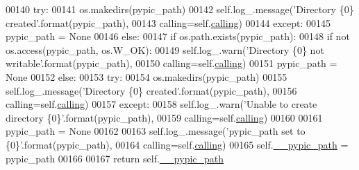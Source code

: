 \begin{DoxyCode}
00140                     \textcolor{keywordflow}{try}:
00141                         os.makedirs(pypic\_path)
00142                         self.log\_.message(\textcolor{stringliteral}{'Directory \{0\} created'}.format(pypic\_path),
00143                                           calling=self.\hyperlink{classpyneb_1_1utils_1_1_config_1_1___config_abf04542e5670abea107260ca7a6baf6d}{calling})
00144                     \textcolor{keywordflow}{except}:
00145                         pypic\_path = \textcolor{keywordtype}{None}
00146         \textcolor{keywordflow}{else}:
00147             \textcolor{keywordflow}{if} os.path.exists(pypic\_path):
00148                 \textcolor{keywordflow}{if} \textcolor{keywordflow}{not} os.access(pypic\_path, os.W\_OK):
00149                     self.log\_.warn(\textcolor{stringliteral}{'Directory \{0\} not writable'}.format(pypic\_path),
00150                                       calling=self.\hyperlink{classpyneb_1_1utils_1_1_config_1_1___config_abf04542e5670abea107260ca7a6baf6d}{calling})
00151                     pypic\_path = \textcolor{keywordtype}{None}
00152             \textcolor{keywordflow}{else}:
00153                 \textcolor{keywordflow}{try}:
00154                     os.makedirs(pypic\_path)
00155                     self.log\_.message(\textcolor{stringliteral}{'Directory \{0\} created'}.format(pypic\_path),
00156                                       calling=self.\hyperlink{classpyneb_1_1utils_1_1_config_1_1___config_abf04542e5670abea107260ca7a6baf6d}{calling})
00157                 \textcolor{keywordflow}{except}:
00158                     self.log\_.warn(\textcolor{stringliteral}{'Unable to create directory \{0\}'}.format(pypic\_path),
00159                                       calling=self.\hyperlink{classpyneb_1_1utils_1_1_config_1_1___config_abf04542e5670abea107260ca7a6baf6d}{calling})
00160                     
00161                     pypic\_path = \textcolor{keywordtype}{None}
00162             
00163         self.log\_.message(\textcolor{stringliteral}{'pypic\_path set to \{0\}'}.format(pypic\_path),
00164                                           calling=self.\hyperlink{classpyneb_1_1utils_1_1_config_1_1___config_abf04542e5670abea107260ca7a6baf6d}{calling})
00165         self.\hyperlink{classpyneb_1_1utils_1_1_config_1_1___config_a1c122165aa8885ce11f9bf86d08c40cd}{\_\_pypic\_path} = pypic\_path
00166         
00167         \textcolor{keywordflow}{return} self.\hyperlink{classpyneb_1_1utils_1_1_config_1_1___config_a1c122165aa8885ce11f9bf86d08c40cd}{\_\_pypic\_path}
    
\end{DoxyCode}
